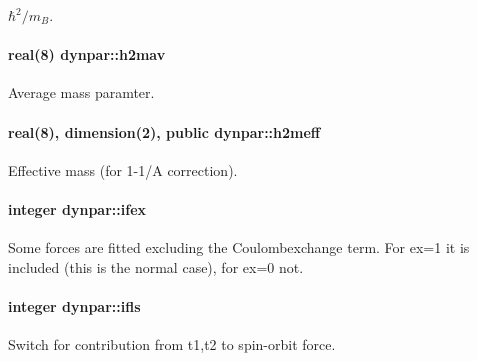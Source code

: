 $ \hbar^2/m_B $. 

\paragraph[{\texorpdfstring{h2mav}{h2mav}}]{\setlength{\rightskip}{0pt plus 5cm}real(8) dynpar\+::h2mav}\hypertarget{namespacedynpar_ac33de9cee1beb56a87e03deca2c70612}{}\label{namespacedynpar_ac33de9cee1beb56a87e03deca2c70612}


Average mass paramter. 

\paragraph[{\texorpdfstring{h2meff}{h2meff}}]{\setlength{\rightskip}{0pt plus 5cm}real(8), dimension(2), public dynpar\+::h2meff}\hypertarget{namespacedynpar_a204c595b7c821e702706ea2aeaa073f6}{}\label{namespacedynpar_a204c595b7c821e702706ea2aeaa073f6}


Effective mass (for 1-\/1/A correction). 

\paragraph[{\texorpdfstring{ifex}{ifex}}]{\setlength{\rightskip}{0pt plus 5cm}integer dynpar\+::ifex}\hypertarget{namespacedynpar_a3d674134cccc9169245f519211dd8cd3}{}\label{namespacedynpar_a3d674134cccc9169245f519211dd8cd3}


Some forces are fitted excluding the Coulombexchange term. For {\ttfamily  ex=1 } it is included (this is the normal case), for {\ttfamily  ex=0 } not. 

\paragraph[{\texorpdfstring{ifls}{ifls}}]{\setlength{\rightskip}{0pt plus 5cm}integer dynpar\+::ifls}\hypertarget{namespacedynpar_a877470f2bcded7acda67b5c1cf9cca5c}{}\label{namespacedynpar_a877470f2bcded7acda67b5c1cf9cca5c}


Switch for contribution from t1,t2 to spin-\/orbit force. 

